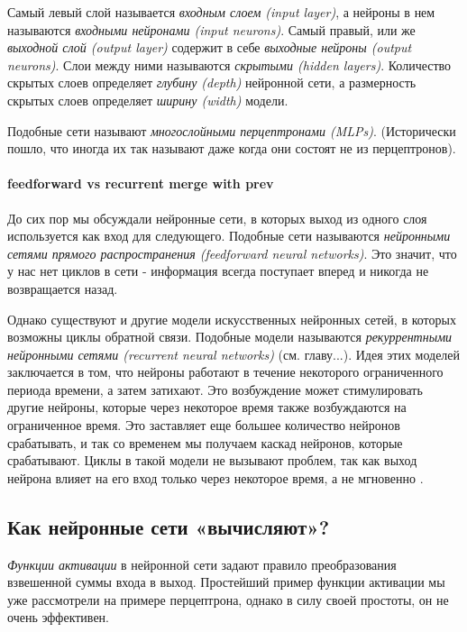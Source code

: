 Самый левый слой называется \textit{входным слоем (input layer)}, а нейроны в нем 
называются \textit{входными нейронами (input neurons)}. Самый правый, или же 
\textit{выходной слой (output layer)} содержит в себе 
\textit{выходные нейроны (output neurons)}. Слои между ними называются 
\textit{скрытыми (hidden layers)}. Количество скрытых слоев определяет 
\textit{глубину (depth)} нейронной сети, а размерность скрытых слоев 
определяет \textit{ширину (width)} модели.

Подобные сети называют \textit{многослойными перцептронами (MLPs)}. (Исторически пошло, 
что иногда их так называют даже когда они состоят не из перцептронов). 

\paragraph{feedforward vs recurrent {\color{red} merge with prev}}

До сих пор мы обсуждали нейронные сети, в которых выход из одного слоя используется как 
вход для следующего. Подобные сети называются \textit{нейронными сетями прямого распространения 
(feedforward neural networks)}. Это значит, что у нас нет циклов в сети - информация всегда 
поступает вперед и никогда не возвращается назад.

Однако существуют и другие модели искусственных нейронных сетей, 
в которых возможны циклы обратной связи. Подобные модели называются 
\textit{рекуррентными нейронными сетями (recurrent neural networks)} 
(см. {\color{red} главу...}). 
Идея этих моделей заключается в 
том, что нейроны работают в течение некоторого ограниченного периода 
времени, а затем затихают. Это возбуждение может стимулировать другие 
нейроны, которые через некоторое время также возбуждаются на ограниченное 
время. Это заставляет еще большее количество нейронов срабатывать, и 
так со временем мы получаем каскад нейронов, которые срабатывают. Циклы 
в такой модели не вызывают проблем, так как выход нейрона влияет на его 
вход только через некоторое время, а не мгновенно \cite{NN_Nielsen}.

\subsection{Как нейронные сети «вычисляют»?}

\textit{Функции активации} в нейронной сети задают правило преобразования 
взвешенной суммы входа в выход. Простейший пример функции активации мы уже 
рассмотрели на примере перцептрона, однако в силу своей простоты, он не очень 
эффективен. 

